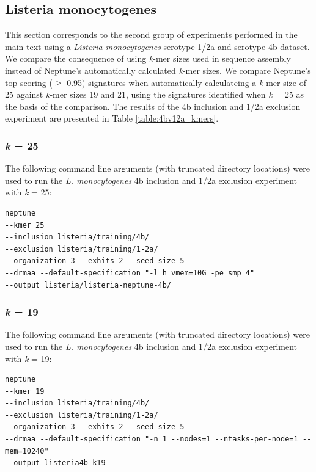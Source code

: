 \documentclass[a4paper,10pt]{article}
\begin{document}
\subsection{Listeria monocytogenes}

This section corresponds to the second group of experiments performed in the main text using a \textit{Listeria monocytogenes} serotype 1/2a and serotype 4b dataset. We compare the consequence of using \textit{k}-mer sizes used in sequence assembly instead of Neptune's automatically calculated \textit{k}-mer sizes. We compare Neptune's top-scoring (\(\geq\) 0.95) signatures when automatically calculateing a \textit{k}-mer size of 25 against \textit{k}-mer sizes 19 and 21, using the signatures identified when \textit{k} = 25 as the basis of the comparison. The results of the 4b inclusion and 1/2a exclusion experiment are presented in Table \ref{table:4bv12a_kmers}.

\subsubsection*{\textit{k} = 25}

The following command line arguments (with truncated directory locations) were used to run the \textit{L. monocytogenes} 4b inclusion and 1/2a exclusion experiment with \textit{k} = 25:

\begin{verbatim}
neptune
--kmer 25
--inclusion listeria/training/4b/
--exclusion listeria/training/1-2a/
--organization 3 --exhits 2 --seed-size 5
--drmaa --default-specification "-l h_vmem=10G -pe smp 4"
--output listeria/listeria-neptune-4b/
\end{verbatim}

\subsubsection*{\textit{k} = 19}

The following command line arguments (with truncated directory locations) were used to run the \textit{L. monocytogenes} 4b inclusion and 1/2a exclusion experiment with \textit{k} = 19:

\begin{verbatim}
neptune
--kmer 19
--inclusion listeria/training/4b/
--exclusion listeria/training/1-2a/
--organization 3 --exhits 2 --seed-size 5
--drmaa --default-specification "-n 1 --nodes=1 --ntasks-per-node=1 --mem=10240"
--output listeria4b_k19
\end{verbatim}
\end{document}
